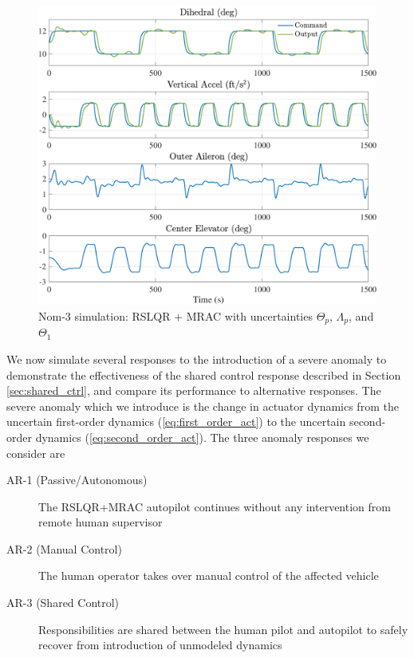 \documentclass[english]{ifacconf}
\begin{document}
\begin{figure}[htbp]
	\centering
	\includegraphics[width=\columnwidth]{../fig/nom3.pdf}
	\caption{Nom-3 simulation: RSLQR + MRAC with uncertainties $\Theta_p$, $\Lambda_p$, and $\Theta_1$}
	\label{fig:nom3}
\end{figure}

We now simulate several responses to the introduction of a severe anomaly to demonstrate the effectiveness of the shared control response described in Section \ref{sec:shared_ctrl}, and compare its performance to alternative responses. The severe anomaly which we introduce is the change in actuator dynamics from the uncertain first-order dynamics (\ref{eq:first_order_act}) to the uncertain second-order dynamics (\ref{eq:second_order_act}). The three anomaly responses we consider are
\begin{description}
	\item[AR-1 (Passive/Autonomous)] The RSLQR+MRAC autopilot continues without any intervention from remote human supervisor
	\item[AR-2 (Manual Control)] The human operator takes over manual control of the affected vehicle
	\item[AR-3 (Shared Control)] Responsibilities are shared between the human pilot and autopilot to safely recover from introduction of unmodeled dynamics
\end{description}
\end{document}

